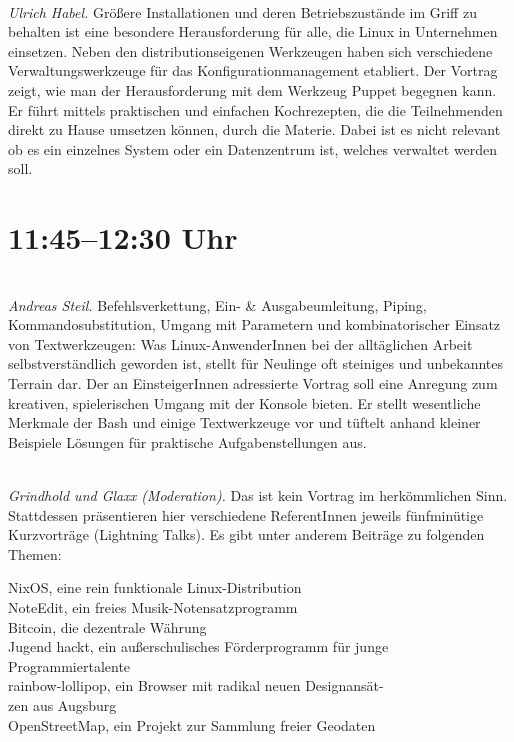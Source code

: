 \documentclass[10pt,a4paper,ngerman]{scrartcl}
\let\origdescription\description
\renewenvironment{description}{
  \setlength{\leftmargini}{0em}
  \origdescription
  \setlength{\itemindent}{0em}
  \setlength{\itemsep}{1.2em}
  \setlength{\labelsep}{\textwidth}
}
{\endlist}
\newcommand{\vorschub}{\mbox{}\\[-0.5em]}
\begin{document}
\begin{multicols}{2}
\begin{description}
\item[Zentrale Konfigurationsverwaltung mit Puppet]\vorschub
\textsl{Ulrich Habel.} Größere Installationen und deren Betriebszustände im Griff zu behalten ist eine besondere Herausforderung für alle, die Linux in Unternehmen einsetzen. Neben den distributionseigenen Werkzeugen haben sich verschiedene Verwaltungswerkzeuge für das Konfigurationmanagement etabliert. Der Vortrag zeigt, wie man der Herausforderung mit dem Werkzeug Puppet begegnen kann. Er führt mittels praktischen und einfachen Kochrezepten, die die Teilnehmenden direkt zu Hause umsetzen können, durch die Materie. Dabei ist es nicht relevant ob es ein einzelnes System oder ein Datenzentrum ist, welches verwaltet werden soll.

\end{description}

\columnbreak

\section{11:45--12:30 Uhr}
\begin{description}
\item[Some Bashing – Kommandozeile für Einsteiger]\vorschub
\textsl{Andreas Steil.}
Befehlsverkettung, Ein- \& Ausgabeumleitung, Piping, Kommandosubstitution, Umgang mit Parametern und kombinatorischer Einsatz von Textwerkzeugen: Was Linux-AnwenderInnen bei der alltäglichen Arbeit selbstverständlich geworden ist, stellt für Neulinge oft steiniges und unbekanntes Terrain dar. Der an EinsteigerInnen adressierte Vortrag soll eine Anregung zum kreativen, spielerischen Umgang mit der Konsole bieten. Er stellt wesentliche Merkmale der Bash und einige Textwerkzeuge vor und tüftelt anhand kleiner Beispiele Lösungen für praktische Aufgabenstellungen aus.



\item[Lightning Talks]\vorschub
\textsl{Grindhold und Glaxx (Moderation).}
Das ist kein Vortrag im herkömmlichen Sinn. Stattdessen präsentieren hier verschiedene ReferentInnen jeweils fünfminütige Kurzvorträge (Lightning Talks). Es gibt unter anderem Beiträge zu folgenden Themen:

\textbullet{} NixOS, eine rein funktionale Linux-Distribution \\[0.3em]
\textbullet{} NoteEdit, ein freies Musik-Notensatzprogramm \\[0.3em]
\textbullet{} Bitcoin, die dezentrale Währung \\[0.3em]
\textbullet{} Jugend hackt, ein außerschulisches Förderprogramm für junge \\
\phantom{\textbullet} Programmiertalente \\[0.3em]
\textbullet{} rainbow-lollipop, ein Browser mit radikal neuen Designansät- \\
\phantom{\textbullet} zen aus Augsburg \\[0.3em]
\textbullet{} OpenStreetMap, ein Projekt zur Sammlung freier Geodaten


\end{description}
\end{multicols}
\end{document}
